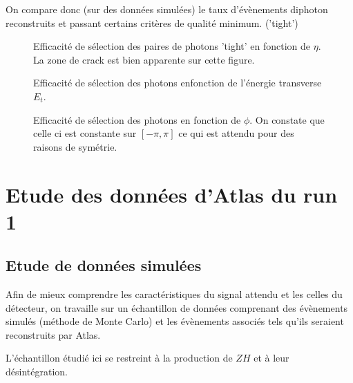 \documentclass[11pt]{article} %
\begin{document}
On compare donc (sur des données simulées) le taux d'évènements diphoton reconstruits et passant certains critères de qualité minimum. ('tight')

\begin{figure}[H]
\centering
  \caption{Efficacité de sélection des paires de photons 'tight' en fonction de $\eta$. La zone de \og crack \fg est bien apparente sur cette figure. }
 \resizebox{.9\linewidth}{!}{}
\end{figure}

\begin{figure}[H]
\centering
  \caption{Efficacité de sélection des photons enfonction de l'énergie transverse $E_t$.}
 \resizebox{.9\linewidth}{!}{}
\end{figure}

\begin{figure}[H]
\centering
  \caption{}
 \resizebox{.9\linewidth}{!}{}
  \caption{Efficacité de sélection des photons en fonction de $\phi$. On constate que celle ci est constante sur $[-\pi,\pi]$ ce qui est attendu pour des raisons de symétrie.}
\end{figure}


\section{Etude des données d'Atlas du run 1}

\subsection{Etude de données simulées}

Afin de mieux comprendre les caractéristiques du signal attendu et les celles du détecteur, on travaille sur un échantillon de données comprenant des évènements simulés (méthode de Monte Carlo) et les évènements associés tels qu'ils seraient reconstruits par Atlas.

L'échantillon étudié ici se restreint à la production de $ZH$ et à leur désintégration.
\end{document}
